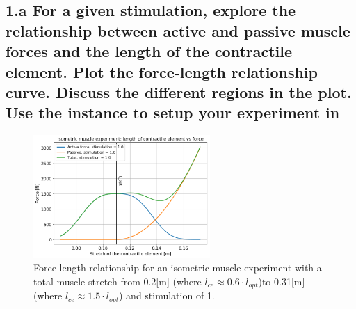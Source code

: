 \documentclass{cmc}
\begin{document}
\subsection*{1.a For a given stimulation, explore the relationship
  between active and passive muscle forces and the length of the
  contractile element.  Plot the force-length relationship curve.
  Discuss the different regions in the plot. Use the
   instance
  to setup your experiment in }


\begin{figure}[H]
    \centering
    \includegraphics[width=0.6\textwidth]{figures/1_a_lce_vs_str.png}
    \caption[Isometric experiment]{Force length relationship for an isometric muscle experiment with a total muscle stretch from 0.2[m] (where $l_{ce}\approx0.6\cdot l_{opt}$)\footnotemark  to 0.31[m] (where $l_{ce}\approx1.5\cdot l_{opt}$) and stimulation of 1.}
    \label{fig:Exercise1a}
\end{figure}

\end{document}
